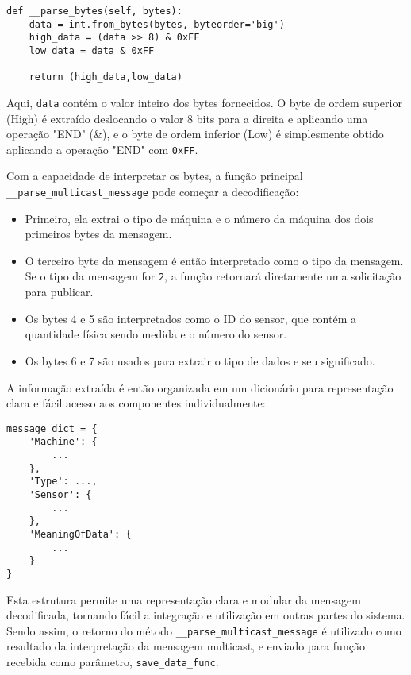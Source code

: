 \begin{verbatim}
def __parse_bytes(self, bytes):
    data = int.from_bytes(bytes, byteorder='big')
    high_data = (data >> 8) & 0xFF
    low_data = data & 0xFF

    return (high_data,low_data)
\end{verbatim}

Aqui, \texttt{data} contém o valor inteiro dos bytes fornecidos. O byte de ordem superior (High) é extraído deslocando o valor 8 bits para a direita e aplicando uma operação "END" (\&), e o byte de ordem inferior (Low) é simplesmente obtido aplicando a operação "END" com \texttt{0xFF}.

Com a capacidade de interpretar os bytes, a função principal \texttt{\_\_parse\_multicast\_message} pode começar a decodificação:

\begin{itemize}
    \item Primeiro, ela extrai o tipo de máquina e o número da máquina dos dois primeiros bytes da mensagem.
    
    \item O terceiro byte da mensagem é então interpretado como o tipo da mensagem. Se o tipo da mensagem for \texttt{2}, a função retornará diretamente uma solicitação para publicar.
    
    \item Os bytes 4 e 5 são interpretados como o ID do sensor, que contém a quantidade física sendo medida e o número do sensor.
    
    \item Os bytes 6 e 7 são usados para extrair o tipo de dados e seu significado.
\end{itemize}

A informação extraída é então organizada em um dicionário para representação clara e fácil acesso aos componentes individualmente:

\begin{verbatim}
message_dict = {
    'Machine': {
        ...
    },
    'Type': ...,
    'Sensor': {
        ...
    },
    'MeaningOfData': {
        ...
    }
}
\end{verbatim}

Esta estrutura permite uma representação clara e modular da mensagem decodificada, tornando fácil a integração e utilização em outras partes do sistema. Sendo assim, o retorno do método \texttt{\_\_parse\_multicast\_message} é utilizado como resultado da interpretação da mensagem multicast, e enviado para função recebida como parâmetro, \texttt{save\_data\_func}.

